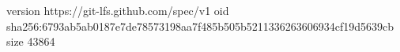 version https://git-lfs.github.com/spec/v1
oid sha256:6793ab5ab0187e7de78573198aa7f485b505b5211336263606934cf19d5639cb
size 43864
